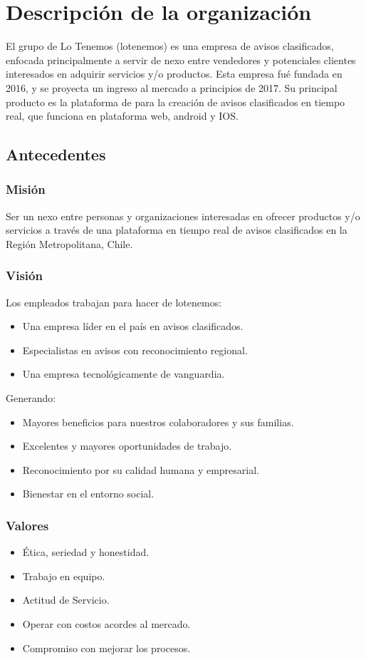 \documentclass[letterpaper,openright,10pt,twoside]{report}
\begin{document}
		\section{Descripción de la organización}
		El grupo de Lo Tenemos (lotenemos) es una empresa de avisos clasificados, enfocada principalmente a servir de nexo entre vendedores y potenciales clientes interesados en adquirir servicios y/o productos. Esta empresa fué fundada en 2016, y se proyecta un ingreso al mercado a principios de 2017.
		Su principal producto es la plataforma de para la creación de avisos clasificados en tiempo real, que funciona en plataforma web, android y IOS.
			\subsection{Antecedentes}
				\subsubsection{Misión}
					Ser un nexo entre personas y organizaciones interesadas en ofrecer productos y/o servicios a través de una plataforma en tiempo real de avisos clasificados en la Región Metropolitana, Chile.
				\subsubsection{Visión}
					Los empleados trabajan para hacer de lotenemos:
						\begin{itemize}
							\item Una empresa líder en el país en avisos clasificados.
							\item Especialistas en avisos con reconocimiento regional.
							\item Una empresa tecnológicamente de vanguardia.
\end{itemize}
			Generando:
			\begin{itemize}
				\item Mayores beneficios para nuestros colaboradores y sus familias.
				\item Excelentes y mayores oportunidades de trabajo.
				\item Reconocimiento por su calidad humana y empresarial.
				\item Bienestar en el entorno social.
\end{itemize}
			 \subsubsection{Valores}
			 	\begin{itemize}
					\item Ética, seriedad y honestidad.
					\item Trabajo en equipo.
					\item Actitud de Servicio.
					\item Operar con costos acordes al mercado.
					\item Compromiso con mejorar los procesos.
\end{itemize}
\end{document}

